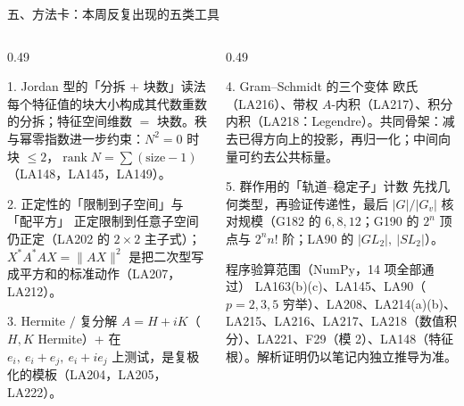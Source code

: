 \documentclass[aspectratio=169,10pt,fontset=none]{ctexbeamer}
\begin{document}
\begin{frame}[t]{五、方法卡：本周反复出现的五类工具}
  \begin{columns}[T,onlytextwidth]
    \begin{column}{0.49\textwidth}
      \begin{block}{\footnotesize 1. Jordan 型的「分拆 + 块数」读法}
        \scriptsize
        每个特征值的块大小构成其代数重数的分拆；特征空间维数 $=$ 块数。秩与幂零指数进一步约束：$N^2=0$ 时块 $\le2$，$\operatorname{rank}N=\sum(\text{size}-1)$（LA148，LA145，LA149）。
      \end{block}
      \begin{block}{\footnotesize 2. 正定性的「限制到子空间」与「配平方」}
        \scriptsize
        正定限制到任意子空间仍正定（LA202 的 $2\times2$ 主子式）；$X^*A^*AX=\lVert AX\rVert^2$ 是把二次型写成平方和的标准动作（LA207，LA212）。
      \end{block}
      \begin{block}{\footnotesize 3. Hermite $/$ 复分解}
        \scriptsize
        $A=H+iK$（$H,K$ Hermite）+ 在 $e_i,\ e_i+e_j,\ e_i+ie_j$ 上测试，是复极化的模板（LA204，LA205，LA222）。
      \end{block}
    \end{column}
    \begin{column}{0.49\textwidth}
      \begin{block}{\footnotesize 4. Gram--Schmidt 的三个变体}
        \scriptsize
        欧氏（LA216）、带权 $A$-内积（LA217）、积分内积（LA218：Legendre）。共同骨架：减去已得方向上的投影，再归一化；中间向量可约去公共标量。
      \end{block}
      \begin{block}{\footnotesize 5. 群作用的「轨道--稳定子」计数}
        \scriptsize
        先找几何类型，再验证传递性，最后 $|G|/|G_v|$ 核对规模（G182 的 $6,8,12$；G190 的 $2^n$ 顶点与 $2^nn!$ 阶；LA90 的 $|GL_2|,\ |SL_2|$）。
      \end{block}
      \begin{exampleblock}{\footnotesize 程序验算范围（NumPy，14 项全部通过）}
        \scriptsize
        LA163(b)(c)、LA145、LA90（$p=2,3,5$ 穷举）、LA208、LA214(a)(b)、LA215、LA216、LA217、LA218（数值积分）、LA221、F29（模 2）、LA148（特征根）。解析证明仍以笔记内独立推导为准。
      \end{exampleblock}
    \end{column}
  \end{columns}
\end{frame}
\end{document}
